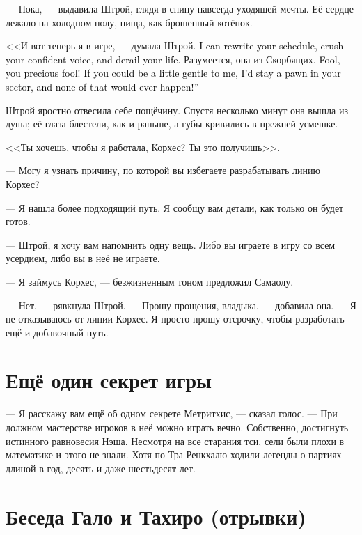 \documentclass[a4paper,12pt,fleqn]{book}\usepackage{cooltooltips}\usepackage{polyglossia}\setdefaultlanguage[babelshorthands=true]{russian}\setotherlanguage{english}\defaultfontfeatures{Ligatures=TeX,Mapping=tex-text} \usepackage{xcolor}\definecolor{lightgray}{HTML}{bbbbbb}\color{lightgray}\newcommand{\ml}[3]{\textenglish{\textcolor{black}{#3}}}
\newcommand{\asterism}{\vspace{1em}{\centering\Large\bfseries$\ast~\ast~\ast$\par}\vspace{1em}}
\begin{document}
{--- Пока, --- выдавила Штрой, глядя в спину навсегда уходящей мечты.
Её сердце лежало на холодном полу, пища, как брошенный котёнок.

<<И вот теперь я в игре, --- думала Штрой.
\ml{$0-[ej]$}
{--- Я могу испортить твоё расписание, раздавить твой уверенный голос и пустить твою жизнь под откос.}
{I can rewrite your schedule, crush your confident voice, and derail your life.}
Разумеется, она из Скорбящих.
\ml{$0-[ej]$}
{Дура, милая дура!}
{Fool, you precious fool!}
\ml{$0-[ej]$}
{Прояви ты тогда хоть каплю нежности --- я бы осталась пешкой в твоём отделе, и ничего бы этого не случилось!>>}
{If you could be a little gentle to me, I'd stay a pawn in your sector, and none of that would ever happen!''}

Штрой яростно отвесила себе пощёчину.
Спустя несколько минут она вышла из душа;
её глаза блестели, как и раньше, а губы кривились в прежней усмешке.

<<Ты хочешь, чтобы я работала, Корхес?
Ты это получишь>>.

\asterism

--- Могу я узнать причину, по которой вы избегаете разрабатывать линию Корхес?

--- Я нашла более подходящий путь.
Я сообщу вам детали, как только он будет готов.

--- Штрой, я хочу вам напомнить одну вещь.
Либо вы играете в игру со всем усердием, либо вы в неё не играете.

--- Я займусь Корхес, --- безжизненным тоном предложил Самаолу.

--- Нет, --- рявкнула Штрой.
--- Прошу прощения, владыка, --- добавила она.
--- Я не отказываюсь от линии Корхес.
Я просто прошу отсрочку, чтобы разработать ещё и добавочный путь.

\section{Ещё один секрет игры}

--- Я расскажу вам ещё об одном секрете Метритхис, --- сказал голос.
--- При должном мастерстве игроков в неё можно играть вечно.
Собственно, достигнуть истинного равновесия Нэша.
Несмотря на все старания тси, сели были плохи в математике и этого не знали.
Хотя по Тра-Ренкхалю ходили легенды о партиях длиной в год, десять и даже шестьдесят лет.

\section{Беседа Гало и Тахиро (отрывки)}

}
\end{document}
